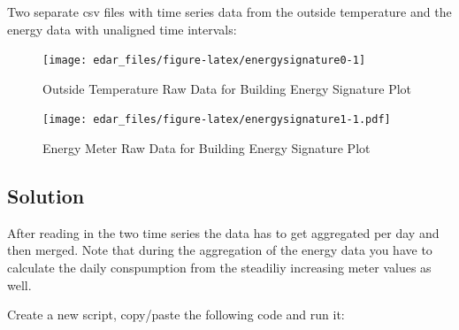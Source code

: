 \documentclass[
  a4paperpaper,
]{book}
\begin{document}
Two separate csv files with time series data from the outside temperature and the energy data with unaligned time intervals:

\begin{figure}
\texttt{[image: edar\_files/figure-latex/energysignature0-1]} \caption{Outside Temperature Raw Data for Building Energy Signature Plot}\label{fig:energysignature0}
\end{figure}

\begin{figure}
\centering
\texttt{[image: edar\_files/figure-latex/energysignature1-1.pdf]}
\caption{\label{fig:energysignature1}Energy Meter Raw Data for Building Energy Signature Plot}
\end{figure}

\newpage

\hypertarget{solution-23}{%
\subsection{Solution}\label{solution-23}}

After reading in the two time series the data has to get aggregated per day and then merged. Note that during the aggregation of the energy data you have to calculate the daily conspumption from the steadiliy increasing meter values as well.

Create a new script, copy/paste the following code and run it:
\end{document}
